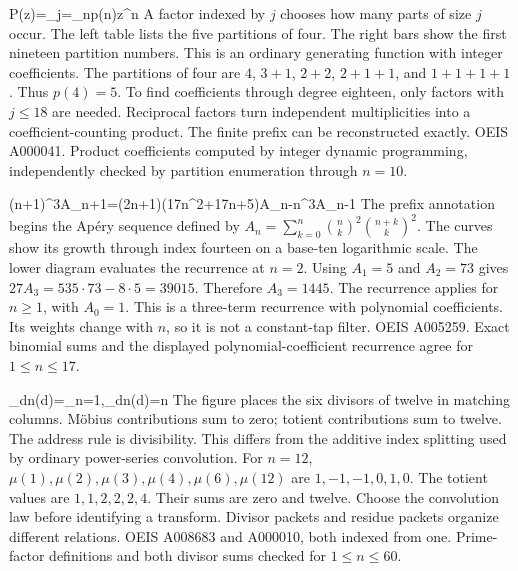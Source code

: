 {P(z)=\prod_{j}=\sum_{n}p(n)z^n}
{A factor indexed by $j$ chooses how many parts of size $j$ occur. The left table lists the five partitions of four. The right bars show the first nineteen partition numbers. This is an ordinary generating function with integer coefficients.}
{The partitions of four are $4$, $3+1$, $2+2$, $2+1+1$, and $1+1+1+1$. Thus $p(4)=5$. To find coefficients through degree eighteen, only factors with $j\le18$ are needed.}
{Reciprocal factors turn independent multiplicities into a coefficient-counting product. The finite prefix can be reconstructed exactly.}
{OEIS A000041. Product coefficients computed by integer dynamic programming, independently checked by partition enumeration through $n=10$.}

{(n+1)^3A_{n+1}=(2n+1)(17n^2+17n+5)A_n-n^3A_{n-1}}
{The prefix annotation begins the Apéry sequence defined by $A_n=\sum_{k=0}^{n}\binom nk^2\binom{n+k}{k}^2$. The curves show its growth through index fourteen on a base-ten logarithmic scale. The lower diagram evaluates the recurrence at $n=2$.}
{Using $A_1=5$ and $A_2=73$ gives $27A_3=535\cdot73-8\cdot5=39015$. Therefore $A_3=1445$. The recurrence applies for $n\ge1$, with $A_0=1$.}
{This is a three-term recurrence with polynomial coefficients. Its weights change with $n$, so it is not a constant-tap filter.}
{OEIS A005259. Exact binomial sums and the displayed polynomial-coefficient recurrence agree for $1\le n\le17$.}

{\sum_{d\mid n}\mu(d)=_{n=1},\qquad \sum_{d\mid n}\varphi(d)=n}
{The figure places the six divisors of twelve in matching columns. Möbius contributions sum to zero; totient contributions sum to twelve. The address rule is divisibility. This differs from the additive index splitting used by ordinary power-series convolution.}
{For $n=12$, $\mu(1),\mu(2),\mu(3),\mu(4),\mu(6),\mu(12)$ are $1,-1,-1,0,1,0$. The totient values are $1,1,2,2,2,4$. Their sums are zero and twelve.}
{Choose the convolution law before identifying a transform. Divisor packets and residue packets organize different relations.}
{OEIS A008683 and A000010, both indexed from one. Prime-factor definitions and both divisor sums checked for $1\le n\le60$.}

